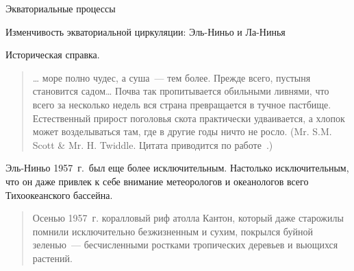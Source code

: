 \begin{chapter}{Экваториальные процессы}
\begin{section}{Изменчивость экваториальной циркуляции: Эль-Ниньо и Ла-Нинья}
\begin{paragraph}{Историческая справка.}
\begin{quotation}
\ldots{} море полно чудес, а суша~--- тем более. Прежде всего, пустыня 
становится садом\ldots{}  Почва так пропитывается обильными ливнями, что всего
за несколько недель вся страна превращается в тучное пастбище. Естественный
прирост поголовья скота практически удваивается, а хлопок может возделываться
там, где в другие годы ничто не росло. 
(Mr. S.M. Scott \& Mr. H. Twiddle. Цитата приводится по работе~\cite{Murphy:1926}.)
%
\end{quotation}

Эль-Ниньо 1957~г.\ был еще более исключительным. Настолько исключительным,
что он даже привлек к себе внимание метеорологов и океанологов всего 
Тихоокеанского бассейна.
%
\begin{quotation}
Осенью 1957~г. коралловый риф атолла Кантон, который даже старожилы помнили
исключительно безжизненным и сухим, покрылся буйной зеленью~--- бесчисленными
ростками тропических деревьев и вьющихся растений.
%


\end{quotation}
\end{paragraph}
\end{section}
\end{chapter}
